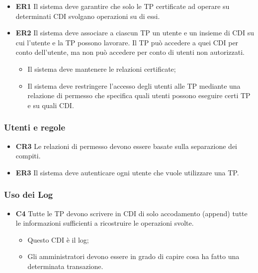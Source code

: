 \begin{itemize}
      \item \textbf{ER1} Il sistema deve garantire che solo le TP certificate ad
            operare su determinati CDI svolgano
            operazioni su di essi.
      \item \textbf{ER2} Il sistema deve associare a ciascun TP un utente e un
            insieme di CDI su cui l'utente e la TP possono lavorare. Il TP può
            accedere a quei CDI per conto dell’utente, ma non può accedere per conto di
            utenti non autorizzati.
            \begin{itemize}
                  \item Il sistema deve mantenere le relazioni certificate;
                  \item Il sistema deve restringere l’accesso degli utenti alle
                        TP mediante una relazione di
                        permesso che specifica quali utenti possono eseguire
                        certi TP e su quali CDI.
            \end{itemize}
\end{itemize}

\subsubsection{Utenti e regole}

\begin{itemize}
      \item \textbf{CR3} Le relazioni di permesso devono essere basate sulla
            separazione dei compiti.
      \item \textbf{ER3} Il sistema deve autenticare ogni utente che vuole
            utilizzare una TP.
\end{itemize}

\subsubsection{Uso dei Log}

\begin{itemize}
      \item \textbf{C4} Tutte le TP devono scrivere in CDI di solo accodamento
            (append) tutte le informazioni
            sufficienti a ricostruire le operazioni svolte.
            \begin{itemize}
                  \item Questo CDI è il log;
                  \item Gli amministratori devono essere in grado di capire
                        cosa ha fatto una determinata
                        transazione.
            \end{itemize}
\end{itemize}

